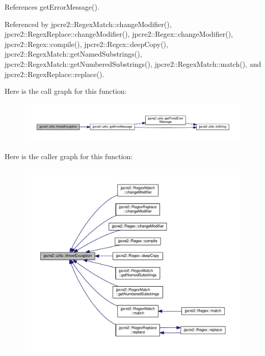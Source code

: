 References get\+Error\+Message().



Referenced by jpcre2\+::\+Regex\+Match\+::change\+Modifier(), jpcre2\+::\+Regex\+Replace\+::change\+Modifier(), jpcre2\+::\+Regex\+::change\+Modifier(), jpcre2\+::\+Regex\+::compile(), jpcre2\+::\+Regex\+::deep\+Copy(), jpcre2\+::\+Regex\+Match\+::get\+Named\+Substrings(), jpcre2\+::\+Regex\+Match\+::get\+Numbered\+Substrings(), jpcre2\+::\+Regex\+Match\+::match(), and jpcre2\+::\+Regex\+Replace\+::replace().



Here is the call graph for this function\+:\nopagebreak
\begin{figure}[H]
\begin{center}
\leavevmode
\includegraphics[width=350pt]{namespacejpcre2_1_1utils_a71c7842918bdcc6936266813981492dc_cgraph}
\end{center}
\end{figure}




Here is the caller graph for this function\+:\nopagebreak
\begin{figure}[H]
\begin{center}
\leavevmode
\includegraphics[width=350pt]{namespacejpcre2_1_1utils_a71c7842918bdcc6936266813981492dc_icgraph}
\end{center}
\end{figure}


